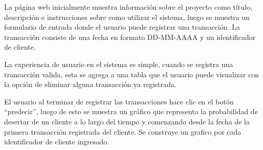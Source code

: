 La página web inicialmente muestra información sobre el proyecto como título, descripción e instrucciones sobre como utilizar el sistema, luego se muestra un formulario de entrada donde el usuario puede registrar una transacción. La transacción consiste de una fecha en formato DD-MM-AAAA y un identificador de cliente. 

La experiencia de usuario en el sistema es simple, cuando se registra una transacción valida, esta se agrega a una tabla que el usuario puede visualizar con la opción de eliminar alguna transacción ya registrada.

El usuario al terminar de registrar las transacciones hace clic en el botón “predecir”, luego de esto se muestra un gráfico que representa la probabilidad de desertar de un cliente a lo largo del tiempo y comenzando desde la fecha de la primera transacción registrada del cliente. Se construye un grafico por cada identificador de cliente ingresado.